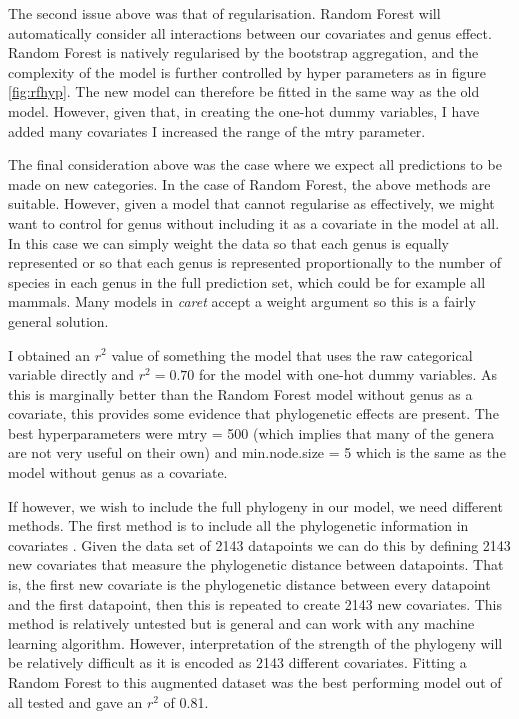 \documentclass[10pt,]{article}
\begin{document}
The second issue above was that of regularisation.
Random Forest will automatically consider all interactions between our covariates and genus effect.
Random Forest is natively regularised by the bootstrap aggregation, and the complexity of the model is further controlled by hyper parameters as in figure \ref{fig:rfhyp}.
The new model can therefore be fitted in the same way as the old model.
However, given that, in creating the one-hot dummy variables, I have added many covariates I increased the range of the mtry parameter.

The final consideration above was the case where we expect all predictions to be made on new categories.
In the case of Random Forest, the above methods are suitable.
However, given a model that cannot regularise as effectively, we might want to control for genus without including it as a covariate in the model at all.
In this case we can simply weight the data so that each genus is equally represented or so that each genus is represented proportionally to the number of species in each genus in the full prediction set, which could be for example all mammals.
Many models in \emph{caret} accept a weight argument so this is a fairly general solution.

I obtained an \(r^2\) value of something the model that uses the raw categorical variable directly and \(r^2 = 0.70\) for the model with one-hot dummy variables.
As this is marginally better than the Random Forest model without genus as a covariate, this provides some evidence that phylogenetic effects are present.
The best hyperparameters were mtry = 500 (which implies that many of the genera are not very useful on their own) and min.node.size = 5 which is the same as the model without genus as a covariate.

If however, we wish to include the full phylogeny in our model, we need different methods.
The first method is to include all the phylogenetic information in covariates \citep{hengl2018random}.
Given the data set of 2143 datapoints we can do this by defining 2143 new covariates that measure the phylogenetic distance between datapoints.
That is, the first new covariate is the phylogenetic distance between every datapoint and the first datapoint, then this is repeated to create 2143 new covariates.
This method is relatively untested but is general and can work with any machine learning algorithm.
However, interpretation of the strength of the phylogeny will be relatively difficult as it is encoded as 2143 different covariates.
Fitting a Random Forest to this augmented dataset was the best performing model out of all tested and gave an \(r^2\) of 0.81.
\end{document}
